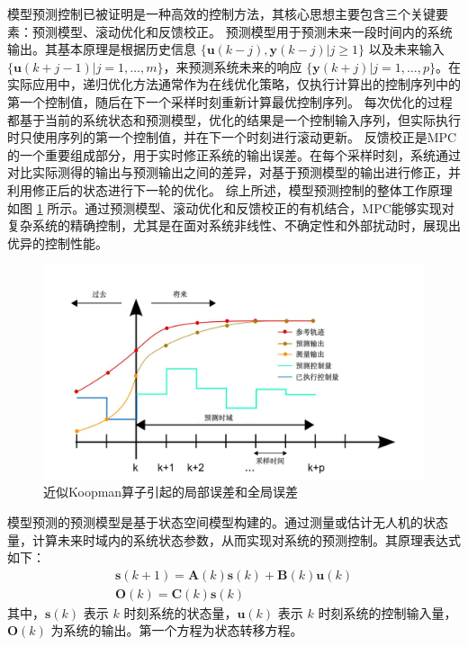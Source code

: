 \documentclass[lang=chs, degree=master, blindreview=false, winfonts=true]{yanputhesis}
\begin{document}
模型预测控制已被证明是一种高效的控制方法\cite{2003A}，其核心思想主要包含三个关键要素：预测模型、滚动优化和反馈校正。
预测模型用于预测未来一段时间内的系统输出。其基本原理是根据历史信息 $\{ \bm u(k-j), \bm y(k-j) | j \geq 1 \}$ 以及未来输入 $\{ \bm u(k+j-1) | j = 1, \dots, m \}$，来预测系统未来的响应 $\{ \bm y(k+j) | j = 1, \dots, p \}$。在实际应用中，递归优化方法通常作为在线优化策略，仅执行计算出的控制序列中的第一个控制值，随后在下一个采样时刻重新计算最优控制序列。
每次优化的过程都基于当前的系统状态和预测模型，优化的结果是一个控制输入序列，但实际执行时只使用序列的第一个控制值，并在下一个时刻进行滚动更新。
反馈校正是MPC的一个重要组成部分，用于实时修正系统的输出误差。在每个采样时刻，系统通过对比实际测得的输出与预测输出之间的差异，对基于预测模型的输出进行修正，并利用修正后的状态进行下一轮的优化。
综上所述，模型预测控制的整体工作原理如图 \ref{mpc} 所示。通过预测模型、滚动优化和反馈校正的有机结合，MPC能够实现对复杂系统的精确控制，尤其是在面对系统非线性、不确定性和外部扰动时，展现出优异的控制性能。

\begin{figure}[hbt!]
	\centering
	\includegraphics[width=40pc]{picture/mpc.jpg} 
	\caption{近似Koopman算子引起的局部误差和全局误差} \label{mpc}
\end{figure}

模型预测的预测模型是基于状态空间模型构建的。通过测量或估计无人机的状态量，计算未来时域内的系统状态参数，从而实现对系统的预测控制。其原理表达式如下：
\begin{equation}
	\begin{gathered}
\bm s(k+1) = \bm A(k)\bm s(k) + \bm B(k) \bm u(k)\\\bm O(k) = \bm C(k) \bm s(k)
\end{gathered}
\end{equation}
其中，$\bm s(k)$ 表示 $k$ 时刻系统的状态量，$\bm u(k)$ 表示 $k$ 时刻系统的控制输入量，$\bm O(k)$ 为系统的输出。第一个方程为状态转移方程。
\end{document}
